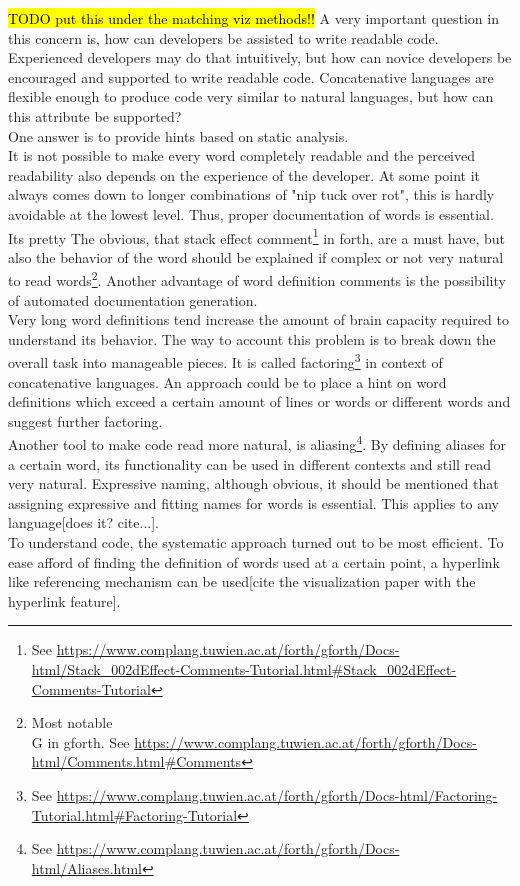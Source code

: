 \hl{TODO put this under the matching viz methods!!}
A very important question in this concern is, how can developers be assisted to write readable code. Experienced developers may do that intuitively, but how can novice developers be encouraged and supported to write readable code. Concatenative languages are flexible enough to produce code very similar to natural languages, but how can this attribute be supported?\\
One answer is to provide hints based on static analysis.\\
It is not possible to make every word completely readable and the perceived readability also depends on the experience of the developer. At some point  it always comes down to longer combinations of "nip tuck over rot", this is hardly avoidable at the lowest level. Thus, proper documentation of words is essential. Its pretty The obvious, that stack effect comment\footnote{See \url{https://www.complang.tuwien.ac.at/forth/gforth/Docs-html/Stack\_002dEffect-Comments-Tutorial.html\#Stack\_002dEffect-Comments-Tutorial}} in forth, are a must have, but also the behavior of the word should be explained if complex or not very natural to read words\footnote{Most notable \\G in gforth. See \url{https://www.complang.tuwien.ac.at/forth/gforth/Docs-html/Comments.html\#Comments}}. Another advantage of word definition comments is the possibility of automated documentation generation.\\
Very long word definitions tend increase the amount of brain capacity required to understand its behavior. The way to account this problem is to break down the overall task into manageable pieces. It is called factoring\footnote{See \url{https://www.complang.tuwien.ac.at/forth/gforth/Docs-html/Factoring-Tutorial.html\#Factoring-Tutorial}} in context of concatenative languages. An approach could be to place a hint on word definitions which exceed a certain amount of lines or words or different words and suggest further factoring.\\
Another tool to make code read more natural, is aliasing\footnote{See \url{https://www.complang.tuwien.ac.at/forth/gforth/Docs-html/Aliases.html}}. By defining aliases for a certain word, its functionality can be used in different contexts and still read very natural.
Expressive naming, although obvious, it should be mentioned that assigning expressive and fitting names for words is essential. This applies to any language[does it? cite...].\\
To understand code, the systematic approach turned out to be most efficient\cite{Robillard:2004:EDI:1042203.1042417}. To ease afford of finding the definition of words used at a certain point, a hyperlink like referencing mechanism can be used[cite the visualization paper with the hyperlink feature].\\
